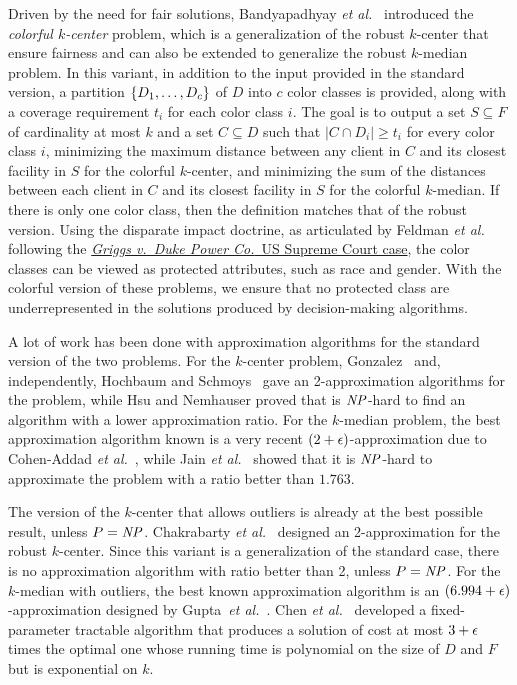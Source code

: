\documentclass[12pt]{article}
\begin{document}
Driven by the need for fair solutions, Bandyapadhyay \emph{et al.}~\cite{BIPV2019} introduced the \emph{colorful $k$-center} problem, which is a generalization of the robust $k$-center that ensure fairness and can also be extended to generalize the robust $k$-median problem. 
In this variant, in addition to the input provided in the standard version, a partition $\{D_1,\ldots, D_c\}$ of $D$ into $c$ color classes is provided, along with a coverage requirement $t_i$  for each color class $i$. 
The goal is to output a set $S \subseteq F$ of cardinality at most $k$ and a set $C \subseteq D$ such that $|C \cap D_i| \geq t_i$ for every color class $i$, minimizing the maximum distance between any client in $C$ and its closest facility in $S$ for the colorful $k$-center, and minimizing the sum of the distances between each client in $C$ and its closest facility in $S$ for the colorful $k$-median.
If there is only one color class, then the definition matches that of the robust version.
Using the disparate impact doctrine, as articulated by Feldman \emph{et al.}~\cite{FSMSV2015} following the \href{https://en.wikipedia.org/wiki/Griggs_v._Duke_Power_Co.}{\emph{Griggs v.\ Duke Power Co.}\ US Supreme Court case}, the color classes can be viewed as protected attributes, such as race and gender. 
With the colorful version of these problems, we ensure that no protected class are underrepresented in the solutions produced by decision-making algorithms.

A lot of work has been done with approximation algorithms for the standard version of the two problems.
For the $k$-center problem, Gonzalez~\cite{G1985} and, independently, Hochbaum and Schmoys~\cite{HS1985} gave an 2-approximation algorithms for the problem, while Hsu and Nemhauser proved that is $\mathit{NP}$-hard to find an algorithm with a lower approximation ratio.
For the $k$-median problem, the best approximation algorithm known is a very recent $(2 + \epsilon)$-approximation due to Cohen-Addad \emph{et al.}~\cite{CGLS2025}, while Jain \emph{et al.}~\cite{JMS2002} showed that it is $\mathit{NP}$-hard to approximate the problem with a ratio better than $1.763$.

The version of the $k$-center that allows outliers is already at the best possible result, unless $P=\mathit{NP}$. 
Chakrabarty \emph{et al.}~\cite{CGK2020} designed an 2-approximation for the robust $k$-center. 
Since this variant is a generalization of the standard case, there is no approximation algorithm with ratio better than 2, unless $P = \mathit{NP}$. 
For the $k$-median with outliers, the best known approximation algorithm is an $(6.994 + \epsilon)$-approximation designed by Gupta~\emph{et al.}~\cite{GMZ2021}.
Chen \emph{et al.}~\cite{CHXXZ2024} developed a fixed-parameter tractable algorithm that produces a solution of cost at most $3 + \epsilon$ times the optimal one whose running time is polynomial on the size of $D$ and $F$ but is exponential on $k$.
\end{document}
